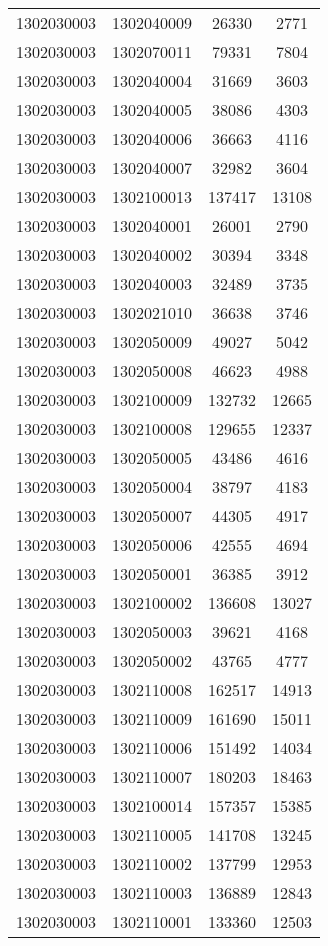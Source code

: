\begin{longtable}{llcc}
1302030003 & 1302040009 & 26330 & 2771\\
1302030003 & 1302070011 & 79331 & 7804\\
1302030003 & 1302040004 & 31669 & 3603\\
1302030003 & 1302040005 & 38086 & 4303\\
1302030003 & 1302040006 & 36663 & 4116\\
1302030003 & 1302040007 & 32982 & 3604\\
1302030003 & 1302100013 & 137417 & 13108\\
1302030003 & 1302040001 & 26001 & 2790\\
1302030003 & 1302040002 & 30394 & 3348\\
1302030003 & 1302040003 & 32489 & 3735\\
1302030003 & 1302021010 & 36638 & 3746\\
1302030003 & 1302050009 & 49027 & 5042\\
1302030003 & 1302050008 & 46623 & 4988\\
1302030003 & 1302100009 & 132732 & 12665\\
1302030003 & 1302100008 & 129655 & 12337\\
1302030003 & 1302050005 & 43486 & 4616\\
1302030003 & 1302050004 & 38797 & 4183\\
1302030003 & 1302050007 & 44305 & 4917\\
1302030003 & 1302050006 & 42555 & 4694\\
1302030003 & 1302050001 & 36385 & 3912\\
1302030003 & 1302100002 & 136608 & 13027\\
1302030003 & 1302050003 & 39621 & 4168\\
1302030003 & 1302050002 & 43765 & 4777\\
1302030003 & 1302110008 & 162517 & 14913\\
1302030003 & 1302110009 & 161690 & 15011\\
1302030003 & 1302110006 & 151492 & 14034\\
1302030003 & 1302110007 & 180203 & 18463\\
1302030003 & 1302100014 & 157357 & 15385\\
1302030003 & 1302110005 & 141708 & 13245\\
1302030003 & 1302110002 & 137799 & 12953\\
1302030003 & 1302110003 & 136889 & 12843\\
1302030003 & 1302110001 & 133360 & 12503\\

\end{longtable}
